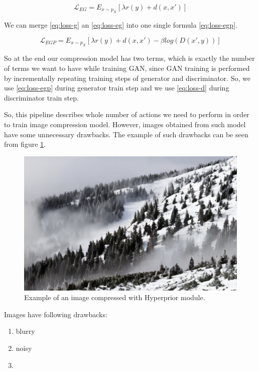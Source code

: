 \begin{equation}
    \label{eq:loss-eg}
    \mathcal{L}_{EG}=E_{x\sim p_X}[\lambda r(y)+d(x, x')]
\end{equation}

We can merge \ref{eq:loss-g} an \ref{eq:loss-eg} into one single formula \ref{eq:loss-egp}.

\begin{equation}
    \label{eq:loss-egp}
    \mathcal{L}_{EGP}=E_{x\sim p_X}[\lambda r(y)+d(x, x')-\beta log(D(x',y))]
\end{equation}

So at the end our compression model has two terms, which is exactly the number of terms we want to have while training GAN, since GAN training is performed by incrementally repeating training steps of generator and discriminator. So, we use \ref{eq:loss-egp} during generator train step and we use \ref{eq:loss-d} during discriminator train step.

So, this pipeline describes whole number of actions we need to perform in order to train image compression model. However, images obtained from such model have some unnecessary drawbacks. The example of such drawbacks can be seen from figure \ref{forest-blurry}.

\begin{figure}[!ht]
    \centering
    \includegraphics[width=\textwidth]{figure/forest-blurry.png}
    \caption{Example of an image compressed with Hyperprior module.}
    \label{forest-blurry}
\end{figure}

Images have following drawbacks:

\begin{enumerate}
    \item blurry
    \item noisy
    \item
\end{enumerate}

